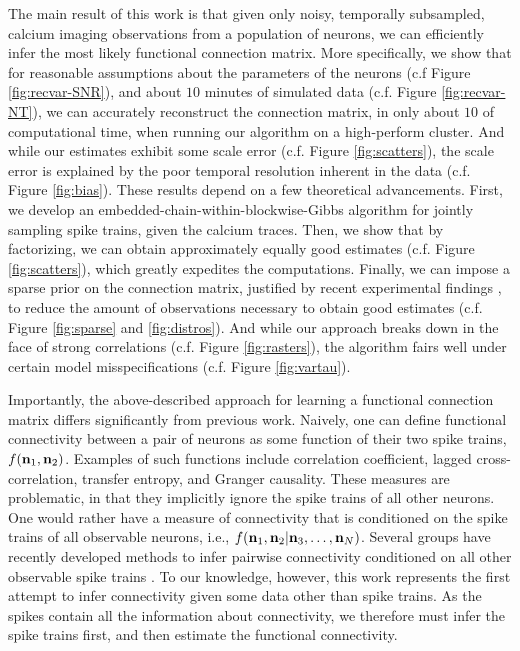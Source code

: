 The main result of this work is that given only noisy, temporally subsampled, calcium imaging observations from a population of neurons, we can efficiently infer the most likely functional connection matrix.  More specifically, we show that for reasonable assumptions about the parameters of the neurons (c.f Figure \ref{fig:recvar-SNR}), and about $10$ minutes of simulated data (c.f. Figure \ref{fig:recvar-NT}), we can accurately reconstruct the connection matrix, in only about $10$ of computational time, when running our algorithm on a high-perform cluster.  And while our estimates exhibit some scale error (c.f. Figure \ref{fig:scatters}), the scale error is explained by the poor temporal resolution inherent in the data (c.f. Figure \ref{fig:bias}).  These results depend on a few theoretical advancements.  First, we develop an embedded-chain-within-blockwise-Gibbs algorithm for jointly sampling spike trains, given the calcium traces. Then, we show that by factorizing, we can obtain approximately equally good estimates (c.f. Figure \ref{fig:scatters}), which greatly expedites the computations.  Finally, we can impose a sparse prior on the connection matrix, justified by recent experimental findings \cite{Chlovksii}, to reduce the amount of observations necessary to obtain good estimates (c.f. Figure \ref{fig:sparse} and \ref{fig:distros}).  And while our approach breaks down in the face of strong correlations (c.f. Figure \ref{fig:rasters}), the algorithm fairs well under certain model misspecifications (c.f. Figure \ref{fig:vartau}).  

Importantly, the above-described approach for learning a functional connection matrix differs significantly from previous work.  Naively, one can define functional connectivity between a pair of neurons as some function of their two spike trains, $f({\bf n}_1,{\bf n}_2)$.  Examples of such functions include correlation coefficient, lagged cross-correlation, transfer entropy, and Granger causality.  These measures are problematic, in that they implicitly ignore the spike trains of all other neurons.  One would rather have a measure of connectivity that is conditioned on the spike trains of all observable neurons, i.e., $f({\bf n}_1,{\bf n}_2 | {\bf n}_3, \ldots, {\bf n}_N)$.  Several groups have recently developed methods to infer pairwise connectivity conditioned on all other observable spike trains \cite{emory, liam, Garofalo, Vakorina, etc.}.  To our knowledge, however, this work represents the first attempt to infer connectivity given some data other than spike trains.  As the spikes contain all the information about connectivity, we therefore must infer the spike trains first, and then estimate the functional connectivity.  

